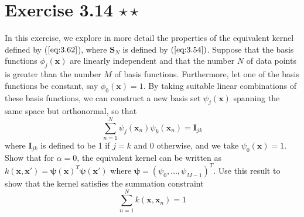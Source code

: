 \section*{Exercise 3.14 $\star \star$}
In this exercise, we explore in more detail the properties of the equivalent
kernel defined by ($\ref{eq:3.62}$), where $\mathbf{S}_N$ is defined by 
$(\ref{eq:3.54})$. Suppose that the basis functions $\phi_j(\mathbf{x})$ are
linearly independent and that the number $N$ of data points is greater
than the number $M$ of basis functions. Furthermore, let one of the basis
functions be constant, say $\phi_0(\mathbf{x}) = 1$. By taking suitable
linear combinations of these basis functions, we can construct a new
basis set $\psi_j(\mathbf{x})$ spanning the same space but orthonormal,
so that 
\begin{equation}\label{eq:3.115}\tag{3.115}
    \sum_{n=1}^{N} \psi_j(\mathbf{x}_n)\psi_k(\mathbf{x}_n) = \mathbf{I}_{jk}
\end{equation}
where $\mathbf{I}_{jk}$ is defined to be 1 if $j = k$ and 0 otherwise,
and we take $\psi_0(\mathbf{x}) = 1$. Show that for $\alpha = 0$,
the equivalent kernel can be written as 
$k(\mathbf{x}, \mathbf{x'}) = \bm{\psi}(\mathbf{x})^T\bm{\psi}(\mathbf{x'})$ 
where $\bm{\psi} = (\psi_0, \ldots, \psi_{M - 1})^T$. Use this result
to show that the kernel satisfies the summation constraint
\begin{equation}\label{eq:3.116}\tag{3.116}
    \sum_{n=1}^{N} k(\mathbf{x}, \mathbf{x}_n) = 1
\end{equation}

\vspace{1em}

